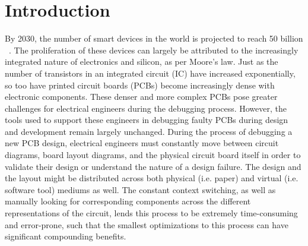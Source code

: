 \documentclass [11pt, proquest] {uwthesis}[2020/02/24]
\begin{document}
\section{Introduction}

By 2030, the number of smart devices in the world is projected to reach 50 billion ~\cite{Mercer2019InternetRevenue}.
The proliferation of these devices can largely be attributed to the increasingly integrated nature of electronics and silicon, as per Moore's law.
Just as the number of transistors in an integrated circuit (IC) have increased exponentially, so too have printed circuit boards (PCBs) become increasingly dense with electronic components.
These denser and more complex PCBs pose greater challenges for electrical engineers during the debugging process.
However, the tools used to support these engineers in debugging faulty PCBs during design and development remain largely unchanged.
During the process of debugging a new PCB design, electrical engineers must constantly move between circuit diagrams, board layout diagrams, and the physical circuit board itself in order to validate their design or understand the nature of a design failure.
The design and the layout might be distributed across both physical (i.e. paper) and virtual (i.e. software tool) mediums as well.
The constant context switching, as well as manually looking for corresponding components across the different representations of the circuit, lends this process to be extremely time-consuming and error-prone, such that the smallest optimizations to this process can have significant compounding benefits.
\end{document}
